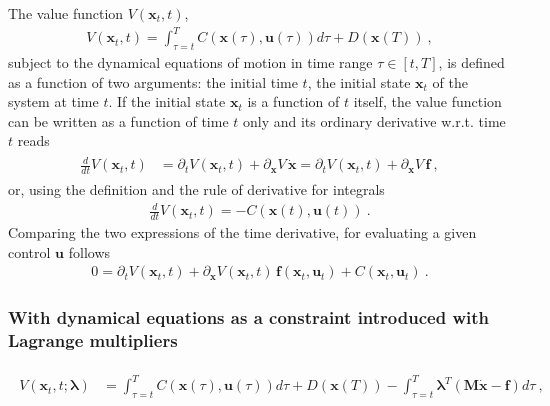 \documentclass[letterpaper,10pt,english]{jupyterBook}
\begin{document}
\sphinxAtStartPar
The value function \(V(\mathbf{x}_t, t)\),
\begin{equation*}
\begin{split}V(\mathbf{x}_t, t) = \int_{\tau=t}^{T} C(\mathbf{x}(\tau), \mathbf{u}(\tau)) d \tau +  D(\mathbf{x}(T)) \ ,\end{split}
\end{equation*}
\sphinxAtStartPar
subject to the dynamical equations of motion in time range \(\tau \in [t, T]\), is defined as a function of two arguments: the initial time \(t\), the initial state \(\mathbf{x}_t\) of the system at time \(t\). If the initial state \(\mathbf{x}_t\) is a function of \(t\) itself, the value function can be written as a function of time \(t\) only and its ordinary derivative w.r.t. time \(t\) reads
\begin{equation*}
\begin{split}\begin{aligned}
  \frac{d}{dt} V(\mathbf{x}_t, t) 
  & = \partial_t V(\mathbf{x}_t,t) +  \partial_\mathbf{x} V \, \dot{\mathbf{x}}   
    = \partial_t V(\mathbf{x}_t,t) +  \partial_\mathbf{x} V \, \mathbf{f} \ , 
\end{aligned}\end{split}
\end{equation*}
\sphinxAtStartPar
or, using the definition and the rule of derivative for integrals
\begin{equation*}
\begin{split}
  \frac{d}{dt} V(\mathbf{x}_t, t) = - C(\mathbf{x}(t), \mathbf{u}(t)) \ .
\end{split}
\end{equation*}
\sphinxAtStartPar
Comparing the two expressions of the time derivative,  for evaluating a given control \(\mathbf{u}\) follows
\begin{equation*}
\begin{split}0 = \partial_t V(\mathbf{x}_t, t) + \partial_{\mathbf{x}} V(\mathbf{x}_t, t) \, \mathbf{f}(\mathbf{x}_t, \mathbf{u}_t) + C(\mathbf{x}_t, \mathbf{u}_t) \ .\end{split}
\end{equation*}\subsubsection*{With dynamical equations as a constraint introduced with Lagrange multipliers}
\begin{equation*}
\begin{split}\begin{aligned}
  V(\mathbf{x}_t, t; \boldsymbol\lambda)
  & = \int_{\tau=t}^{T} C(\mathbf{x}(\tau), \mathbf{u}(\tau)) d \tau +  D(\mathbf{x}(T)) - \int_{\tau=t}^{T} \boldsymbol\lambda^T ( \mathbf{M} \dot{\mathbf{x}} - \mathbf{f} ) d \tau \ ,
\end{aligned}\end{split}
\end{equation*}
\end{document}
